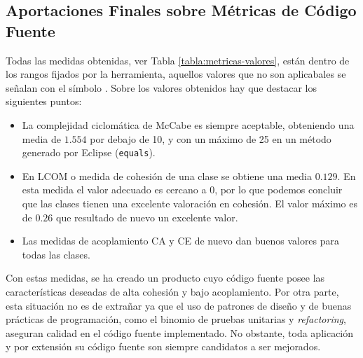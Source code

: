 \subsection{Aportaciones Finales sobre Métricas de Código Fuente}
Todas las medidas obtenidas, ver Tabla \ref{tabla:metricas-valores}, están dentro de
los rangos fijados por la herramienta, aquellos valores que no son aplicabales 
se señalan con el símbolo \na. Sobre los valores obtenidos hay que destacar 
los siguientes puntos:

\begin{itemize}
  \item La complejidad ciclomática de McCabe es siempre aceptable, obteniendo
  una media de $1.554$ por debajo de 10, y con un máximo de 25 en un método generado 
por Eclipse (\texttt{equals}).

  \item En LCOM o medida de cohesión de una clase se obtiene una media $0.129$.
  En esta medida el valor adecuado es cercano a 0, por lo que podemos concluir que
  las clases tienen una excelente valoración en cohesión. El valor máximo
  es de $0.26$ que resultado de nuevo un excelente valor.

  \item Las medidas de acoplamiento CA y CE de nuevo dan buenos valores para
  todas las clases. 

\end{itemize}

Con estas medidas, se ha creado un producto cuyo código fuente posee las
características deseadas de alta cohesión y bajo acoplamiento. Por otra parte,
esta situación no es de extrañar ya que el uso de patrones de diseño y de buenas
prácticas de programación, como el binomio de pruebas unitarias y
\textit{refactoring}, aseguran calidad en el código fuente implementado. No obstante, 
toda aplicación y por extensión su código fuente son siempre candidatos a ser mejorados.




